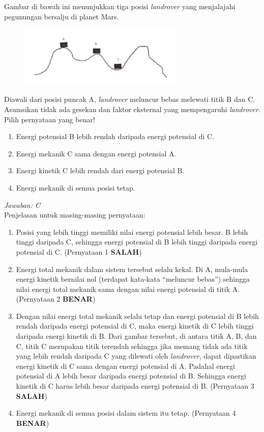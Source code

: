 \documentclass[11pt,fleqn, a4paper]{exam}
\begin{document}
\begin{questions}
\question Gambar di bawah ini menunjukkan tiga posisi \textit{landrover} yang menjalajahi pegunungan bersalju di planet Mars.
\begin{figure}[H]
\centering
\includegraphics[width=0.7\textwidth]{gambar/osk2016_26.png}
\end{figure}
Diawali dari posisi puncak A, \textit{landrover} meluncur bebas melewati titik B dan C. Asumsikan tidak ada gesekan dan faktor eksternal yang mempengaruhi \textit{landrover}. Pilih pernyataan yang benar!
\begin{enumerate}
\item Energi potensial B lebih rendah daripada energi potensial di C.
\item Energi mekanik C sama dengan energi potensial A.
\item Energi kinetik C lebih rendah dari energi potensial B.
\item Energi mekanik di semua posisi tetap.
\end{enumerate}

\textit{Jawaban: C}\\
Penjelasan untuk masing-masing pernyataan:
\begin{enumerate}
\item Posisi yang lebih tinggi memiliki nilai energi potensial lebih besar. B lebih tinggi daripada C, sehingga energi potensial di B lebih tinggi daripada energi potensial di C. (Pernyataan 1 \textbf{SALAH})
\item Energi total mekanik dalam sistem tersebut selalu kekal. Di A, mula-mula energi kinetik bernilai nol (terdapat kata-kata ``meluncur bebas'') sehingga nilai energi total mekanik sama dengan nilai energi potensial di titik A. (Pernyataan 2 \textbf{BENAR})
\item Dengan nilai energi total mekanik selalu tetap dan energi potensial di B lebih rendah daripada energi potensial di C, maka energi kinetik di C lebih tinggi daripada energi kinetik di B. Dari gambar tersebut, di antara titik A, B, dan C, titik C merupakan titik terendah sehingga jika memang tidak ada titik yang lebih rendah daripada C yang dilewati oleh \textit{landrover}, dapat dipastikan energi kinetik di C sama dengan energi potensial di A. Padahal energi potensial di A lebih besar daripada energi potensial di B. Sehingga energi kinetik di C harus lebih besar daripada energi potensial di B. (Pernyataan 3 \textbf{SALAH})
\item Energi mekanik di semua posisi dalam sistem itu tetap. (Pernyataan 4 \textbf{BENAR})
\end{enumerate}


\end{questions}
\end{document}
